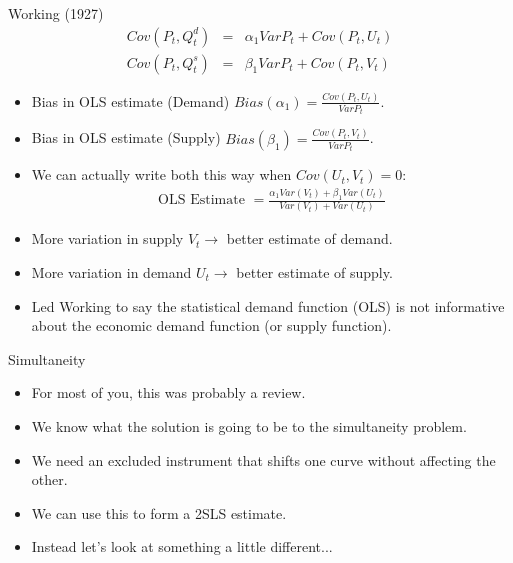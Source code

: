 \begin{frame}{Working (1927)}
\small
\vspace{-0.2cm}
\begin{eqnarray*}
Cov(P_t, Q_t^d) &=& \alpha_1 Var P_t + Cov (P_t,U_t)\\
Cov(P_t, Q_t^s) &=& \beta_1 Var P_t + Cov (P_t,V_t)
\end{eqnarray*}
\vspace{-1cm}
\begin{itemize}
\item Bias in OLS estimate (Demand) $Bias(\alpha_1) = \frac{Cov(P_t,U_t)}{Var P_t}$.
\item Bias in OLS estimate (Supply) $Bias(\beta_1) = \frac{Cov(P_t,V_t)}{Var P_t}$.
\item We can actually write both this way when $Cov(U_t,V_t) = 0$:
\begin{eqnarray*}
\text{OLS Estimate }= \frac{\alpha_1 Var(V_t) + \beta_1 Var (U_t)}{Var (V_t) + Var (U_t)}
\end{eqnarray*}
\item More variation in supply $V_t \rightarrow$ better estimate of demand.
\item More variation in demand $U_t \rightarrow$ better estimate of supply.
\item Led Working to say the \alert{statistical demand function} (OLS) is not informative about the economic demand function (or supply function).
\end{itemize}
\end{frame}

\begin{frame}{Simultaneity}
\begin{itemize}
\item For most of you, this was probably a review.
\item We know what the solution is going to be to the simultaneity problem.
\item We need an \alert{excluded instrument} that shifts one curve without affecting the other.
\item We can use this to form a 2SLS estimate.
\item Instead let's look at something a little different...
\end{itemize}
\end{frame}


